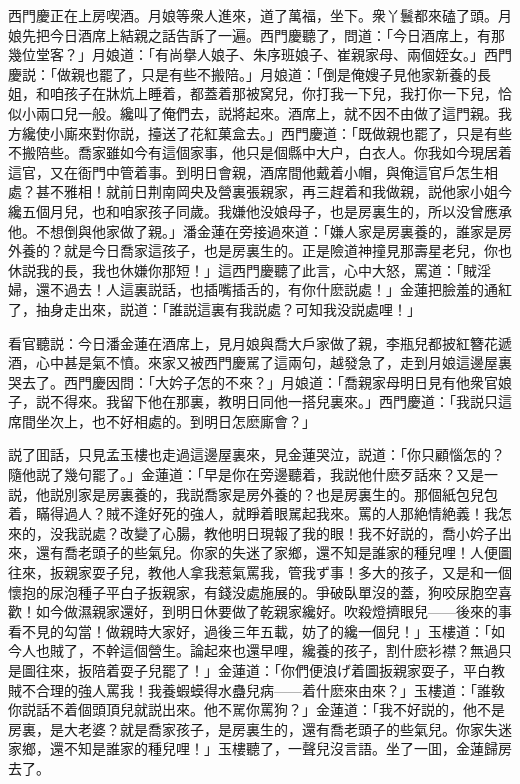 西門慶正在上房喫酒。月娘等衆人進來，道了萬福，坐下。衆丫鬟都來磕了頭。月娘先把今日酒席上結親之話告訴了一遍。西門慶聽了，問道：「今日酒席上，有那幾位堂客？」月娘道：「有尚擧人娘子、朱序班娘子、崔親家母、兩個姪女。」西門慶説：「做親也罷了，只是有些不搬陪。」月娘道：「倒是俺嫂子見他家新養的長姐，和咱孩子在牀炕上睡着，都蓋着那被窝兒，你打我一下兒，我打你一下兒，恰似小兩口兒一般。纔叫了俺們去，説將起來。酒席上，就不因不由做了這門親。我方纔使小廝來對你説，擡送了花紅菓盒去。」西門慶道：「既做親也罷了，只是有些不搬陪些。喬家雖如今有這個家事，他只是個縣中大户，白衣人。你我如今現居着這官，又在衙門中管着事。到明日會親，酒席間他戴着小帽，與俺這官戶怎生相處？甚不雅相！就前日荆南岡央及營裏張親家，再三趕着和我做親，説他家小姐今纔五個月兒，也和咱家孩子同歲。我嫌他没娘母子，也是房裏生的，所以没曾應承他。不想倒與他家做了親。」潘金蓮在旁接過來道：「嫌人家是房裏養的，誰家是房外養的？就是今日喬家這孩子，也是房裏生的。正是險道神撞見那壽星老兒，你也休説我的長，我也休嫌你那短！」這西門慶聽了此言，心中大怒，罵道：「賊淫婦，還不過去！人這裏説話，也插嘴插舌的，有你什麽説處！」金蓮把臉羞的通紅了，抽身走出來，説道：「誰説這裏有我説處？可知我没説處哩！」

看官聽説：今日潘金蓮在酒席上，見月娘與喬大戶家做了親，李瓶兒都披紅簪花遞酒，心中甚是氣不憤。來家又被西門慶駡了這兩句，越發急了，走到月娘這邊屋裏哭去了。西門慶因問：「大妗子怎的不來？」月娘道：「喬親家母明日見有他衆官娘子，説不得來。我留下他在那裏，教明日同他一搭兒裏來。」西門慶道：「我説只這席間坐次上，也不好相處的。到明日怎麽廝會？」

説了囬話，只見孟玉樓也走過這邊屋裏來，見金蓮哭泣，説道：「你只顧惱怎的？隨他説了幾句罷了。」金蓮道：「早是你在旁邊聽着，我説他什麽歹話來？又是一説，他説別家是房裏養的，我説喬家是房外養的？也是房裏生的。那個紙包兒包着，瞞得過人？賊不逢好死的強人，就睜着眼駡起我來。罵的人那絶情絶義！我怎來的，没我説處？改變了心腸，教他明日現報了我的眼！我不好説的，喬小妗子出來，還有喬老頭子的些氣兒。你家的失迷了家鄉，還不知是誰家的種兒哩！人便圖往來，扳親家耍子兒，教他人拿我惹氣罵我，管我ず事！多大的孩子，又是和一個懷抱的尿泡種子平白子扳親家，有錢没處施展的。爭破臥單沒的蓋，狗咬尿胞空喜歡！如今做濕親家還好，到明日休要做了乾親家纔好。吹殺燈擠眼兒——後來的事看不見的勾當！做親時大家好，過後三年五載，妨了的纔一個兒！」玉樓道：「如今人也賊了，不幹這個營生。論起來也還早哩，纔養的孩子，割什麽衫襟？無過只是圖往來，扳陪着耍子兒罷了！」金蓮道：「你們便浪げ着圖扳親家耍子，平白教賊不合理的強人罵我！我養蝦蟆得水蠱兒病——着什麽來由來？」玉樓道：「誰敎你説話不着個頭頂兒就説出來。他不駡你罵狗？」金蓮道：「我不好説的，他不是房裏，是大老婆？就是喬家孩子，是房裏生的，還有喬老頭子的些氣兒。你家失迷家鄉，還不知是誰家的種兒哩！」玉樓聽了，一聲兒沒言語。坐了一囬，金蓮歸房去了。

